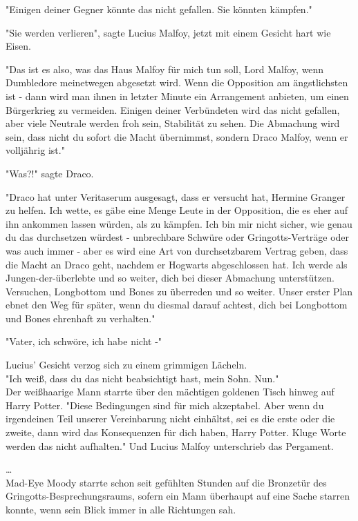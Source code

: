 {"Einigen deiner Gegner könnte das nicht gefallen. Sie könnten kämpfen."

"Sie werden verlieren", sagte Lucius Malfoy, jetzt mit einem Gesicht hart wie Eisen.

"Das ist es also, was das Haus Malfoy für mich tun soll, Lord Malfoy, wenn Dumbledore meinetwegen abgesetzt wird. Wenn die Opposition am ängstlichsten ist - dann wird man ihnen in letzter Minute ein Arrangement anbieten, um einen Bürgerkrieg zu vermeiden. Einigen deiner Verbündeten wird das nicht gefallen, aber viele Neutrale werden froh sein, Stabilität zu sehen. Die Abmachung wird sein, dass nicht du sofort die Macht übernimmst, sondern Draco Malfoy, wenn er volljährig ist."

"Was?!" sagte Draco.

"Draco hat unter Veritaserum ausgesagt, dass er versucht hat, Hermine Granger zu helfen. Ich wette, es gäbe eine Menge Leute in der Opposition, die es eher auf ihn ankommen lassen würden, als zu kämpfen. Ich bin mir nicht sicher, wie genau du das durchsetzen würdest - unbrechbare Schwüre oder Gringotts-Verträge oder was auch immer - aber es wird eine Art von durchsetzbarem Vertrag geben, dass die Macht an Draco geht, nachdem er Hogwarts abgeschlossen hat. Ich werde als Jungen-der-überlebte und so weiter, dich bei dieser Abmachung unterstützen. Versuchen, Longbottom und Bones zu überreden und so weiter. Unser erster Plan ebnet den Weg für später, wenn du diesmal darauf achtest, dich bei Longbottom und Bones ehrenhaft zu verhalten."

"Vater, ich schwöre, ich habe nicht -"

Lucius' Gesicht verzog sich zu einem grimmigen Lächeln.\\ "Ich weiß, dass du das nicht beabsichtigt hast, mein Sohn. Nun."\\ Der weißhaarige Mann starrte über den mächtigen goldenen Tisch hinweg auf Harry Potter. "Diese Bedingungen sind für mich akzeptabel. Aber wenn du irgendeinen Teil unserer Vereinbarung nicht einhältst, sei es die erste oder die zweite, dann wird das Konsequenzen für dich haben, Harry Potter. Kluge Worte werden das nicht aufhalten." Und Lucius Malfoy unterschrieb das Pergament.

…\\ Mad-Eye Moody starrte schon seit gefühlten Stunden auf die Bronzetür des Gringotts-Besprechungsraums, sofern ein Mann überhaupt auf eine Sache starren konnte, wenn sein Blick immer in alle Richtungen sah.

}
